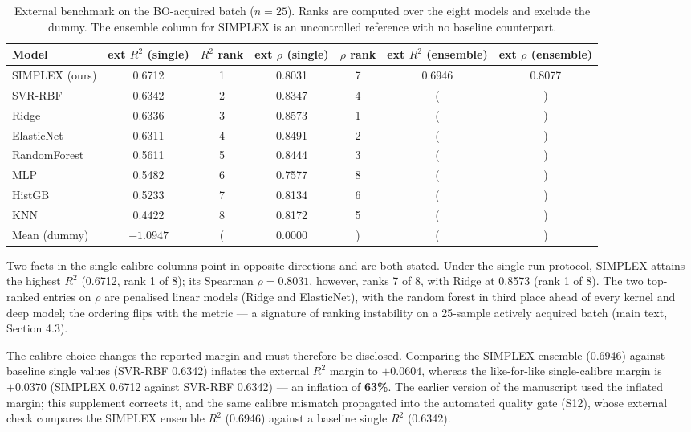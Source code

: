 \documentclass[utf8]{frontiers_suppmat}
\begin{document}
\begin{table}[h]
\centering
\caption{External benchmark on the BO-acquired batch ($n = 25$). Ranks are computed over the eight models and exclude the dummy. The ensemble column for SIMPLEX is an uncontrolled reference with no baseline counterpart.}
\label{tab:S8}
\begin{tabular}{lcccccc}
\toprule
Model & ext $R^2$ (single) & $R^2$ rank & ext $\rho$ (single) & $\rho$ rank & ext $R^2$ (ensemble) & ext $\rho$ (ensemble) \\
\midrule
SIMPLEX (ours) & 0.6712 & 1 & 0.8031 & 7 & 0.6946 & 0.8077 \\
SVR-RBF & 0.6342 & 2 & 0.8347 & 4 & (&) \\
Ridge & 0.6336 & 3 & 0.8573 & 1 & (&) \\
ElasticNet & 0.6311 & 4 & 0.8491 & 2 & (&) \\
RandomForest & 0.5611 & 5 & 0.8444 & 3 & (&) \\
MLP & 0.5482 & 6 & 0.7577 & 8 & (&) \\
HistGB & 0.5233 & 7 & 0.8134 & 6 & (&) \\
KNN & 0.4422 & 8 & 0.8172 & 5 & (&) \\
Mean (dummy) & $-1.0947$ & (& 0.0000 &) & (&) \\
\bottomrule
\end{tabular}
\end{table}

Two facts in the single-calibre columns point in opposite directions and are both stated. Under the single-run protocol, SIMPLEX attains the highest $R^2$ (0.6712, rank 1 of 8); its Spearman $\rho = 0.8031$, however, ranks 7 of 8, with Ridge at 0.8573 (rank 1 of 8). The two top-ranked entries on $\rho$ are penalised linear models (Ridge and ElasticNet), with the random forest in third place ahead of every kernel and deep model; the ordering flips with the metric --- a signature of ranking instability on a 25-sample actively acquired batch (main text, Section 4.3).

The calibre choice changes the reported margin and must therefore be disclosed. Comparing the SIMPLEX ensemble (0.6946) against baseline single values (SVR-RBF 0.6342) inflates the external $R^2$ margin to $+0.0604$, whereas the like-for-like single-calibre margin is $+0.0370$ (SIMPLEX 0.6712 against SVR-RBF 0.6342) --- an inflation of \textbf{63\%}. The earlier version of the manuscript used the inflated margin; this supplement corrects it, and the same calibre mismatch propagated into the automated quality gate (S12), whose external check compares the SIMPLEX ensemble $R^2$ (0.6946) against a baseline single $R^2$ (0.6342).
\end{document}
